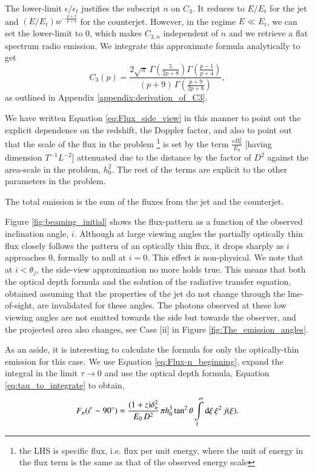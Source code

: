 The lower-limit $ \epsilon / \epsilon_{t} $ justifies the subscript $n$ on $C_{3}$. It reduces to $ E / E_{t} $ for the jet and $ \left(E/E_{t}\right) w^{ -\frac{p+2}{p+4} } $ for the counterjet. However, in the regime $ E\ll E_{t} $, we can set the lower-limit to $0$, which makes $C_{3,n}$ independent of $n$ and we retrieve a flat spectrum radio emission. We integrate this approximate formula analytically to get
\begin{equation}
C_3(p) = \dfrac{2 \sqrt{\pi} \, \Gamma(\frac{5}{2p+8}) \Gamma(\frac{p-1}{p+4})}{ (p+9) \, \Gamma(\frac{p+9}{2p+8}) },
\label{eq:C_3}
\end{equation} as outlined in Appendix \ref{appendix:derivation_of_C3}.

We have written Equation \ref{eq:Flux_side_view} in this manner to point out the explicit dependence on the redshift, the Doppler factor, and also to point out that the scale of the flux in the problem \footnote{the LHS is specific flux, i.e. flux per unit energy, where the unit of energy in the flux term is the same as that of the observed energy scale} is set by the term $ \frac{c B_0^2}{E_0} $ [having dimension $T^{-1} L^{-2}$] attenuated due to the distance by the factor of $D^2$ against the area-scale in the problem, $h_0^2$. The rest of the terms are explicit to the other parameters in the problem.

The total emission is the sum of the fluxes from the jet and the counterjet.

Figure \ref{fig:beaming_initial} shows the flux-pattern as a function of the observed inclination angle, $i$. Although at large viewing angles the partially optically thin flux closely follows the pattern of an optically thin flux, it drops sharply as $i$ approaches $0$, formally to null at $ i = 0 $. This effect is non-physical. We note that at $ i < \theta_j $, the side-view approximation no more holds true. This means that both the optical depth formula and the solution of the radiative transfer equation, obtained assuming that the properties of the jet do not change through the line-of-sight, are invalidated for these angles. The photons observed at these low viewing angles are not emitted towards the side but towards the observer, and the projected area also changes, see Case [ii] in Figure \ref{fig:The_emission_angles}.

As an aside, it is interesting to calculate the formula for only the optically-thin emission for this case. We use Equation \ref{eq:Flux-n_beginning}, expand the integral in the limit $\tau \to 0$ and use the optical depth formula, Equation \ref{eq:tau_to_integrate} to obtain,
\begin{equation}
F_{n} (i' \sim 90^{\circ}) = \frac{ (1+z) \delta_n^2 }{ \ee\, D^2 } \, \pi h_0^{3} \tan^2 \theta \intop_{1}^{\infty} \dd \xi \, \xi^2 \, j(\xi) .
\label{eq:F_thin_formula}
\end{equation}


